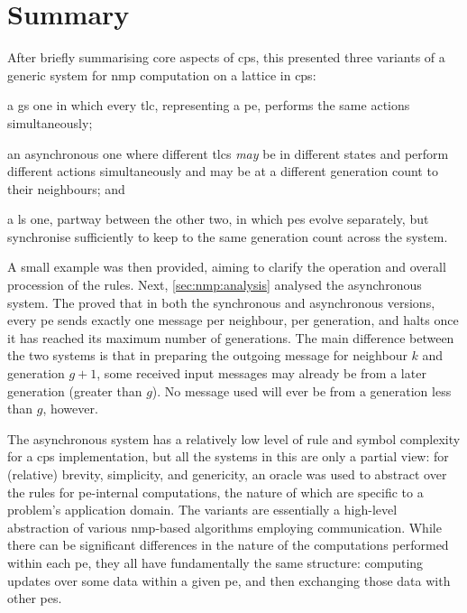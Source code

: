 \section{Summary}
After briefly summarising core aspects of \gls{cps}, this  presented three variants of a generic system for \gls{nmp} computation on a lattice in \gls{cps}:
\begin{inparaenum}[(i)]
\item a \gls{gs} one in which every \gls{tlc}, representing a \gls{pe}, performs the same actions simultaneously;
\item an asynchronous one where different \glspl{tlc} \emph{may} be in different states and perform different actions simultaneously and may be at a different generation count to their neighbours; and
\item a \gls{ls} one, partway between the other two, in which \glspl{pe} evolve separately, but synchronise sufficiently to keep to the same generation count across the system.
\end{inparaenum}

A small example was then provided, aiming to clarify the operation and overall procession of the rules.  Next, \cref{sec:nmp:analysis} analysed the asynchronous system.  The  proved that in both the synchronous and asynchronous versions, every \gls{pe} sends exactly one message per neighbour, per generation, and halts once it has reached its maximum number of generations.  The main difference between the two systems is that in preparing the outgoing message for neighbour \(k\) and generation \(g + 1\), some received input messages may already be from a later generation (greater than \(g\)).  No message used will ever be from a generation less than \(g\), however.

The asynchronous system has a relatively low level of rule and symbol complexity for a \gls{cps} implementation, but all the systems in this  are only a partial view:  for (relative) brevity, simplicity, and genericity, an oracle was used to abstract over the rules for \gls{pe}-internal computations, the nature of which are specific to a problem's application domain.  The variants are essentially a high-level abstraction of various \gls{nmp}-based algorithms employing communication.  While there can be significant differences in the nature of the computations performed within each \gls{pe}, they all have fundamentally the same structure:  computing updates over some data within a given \gls{pe}, and then exchanging those data with other \glspl{pe}.

